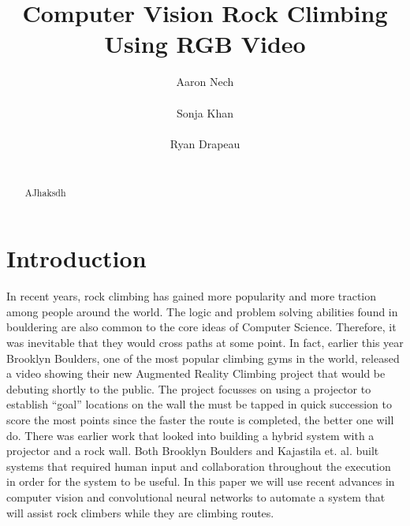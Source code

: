 \documentclass{chi2009}
\begin{document}
\setlength{\paperheight}{11in}
\setlength{\paperwidth}{8.5in}
\setlength{\pdfpageheight}{\paperheight}
\setlength{\pdfpagewidth}{\paperwidth}


\title{Computer Vision Rock Climbing Using RGB Video}
\author{
  \alignauthor Aaron Nech\\
    \\
  \alignauthor Sonja Khan\\
    \\
  \alignauthor Ryan Drapeau\\
    \\
}

\maketitle

\begin{abstract}
AJhaksdh
\end{abstract}


\section{Introduction}
In recent years, rock climbing has gained more popularity and more traction among people around the world. The logic and problem solving abilities found in bouldering are also common to the core ideas of Computer Science. Therefore, it was inevitable that they would cross paths at some point. In fact, earlier this year Brooklyn Boulders, one of the most popular climbing gyms in the world, released a video showing their new Augmented Reality Climbing project that would be debuting shortly to the public. The project focusses on using a projector to establish ``goal'' locations on the wall the must be tapped in quick succession to score the most points since the faster the route is completed, the better one will do. There was earlier work that looked into building a hybrid system with a projector and a rock wall. Both Brooklyn Boulders and Kajastila et. al. built systems that required human input and collaboration throughout the execution in order for the system to be useful. In this paper we will use recent advances in computer vision and convolutional neural networks to automate a system that will assist rock climbers while they are climbing routes.
\end{document}
